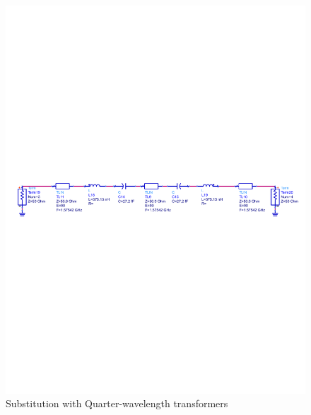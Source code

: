 \documentclass[a4paper]{article}        %
\begin{document}
  \begin{figure}[H]
    \centering
    \includegraphics[width=\textwidth]{fig/Filter/2nd_order/bandpass_discrete_only_series_res.pdf}
    \caption{Substitution with Quarter-wavelength transformers}
    \label{fig:filter_series_res}
  \end{figure}
\end{document}
